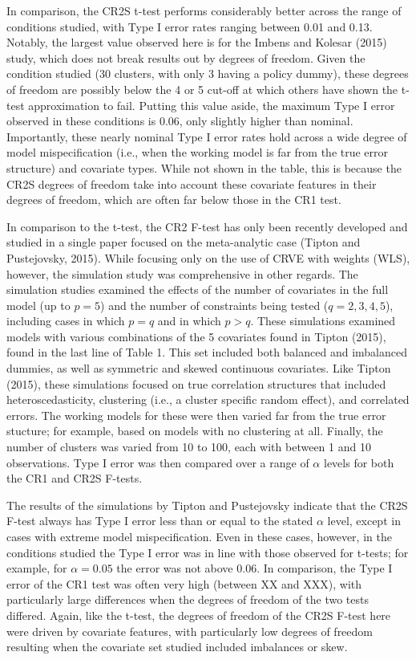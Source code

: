 \documentclass[12pt]{article}\usepackage[]{graphicx}\usepackage[]{color}
\begin{document}
In comparison, the CR2S t-test performs considerably better across the range of conditions studied, with Type I error rates ranging between 0.01 and 0.13.
Notably, the largest value observed here is for the Imbens and Kolesar (2015) study, which does not break results out by degrees of freedom. 
Given the condition studied (30 clusters, with only 3 having a policy dummy), these degrees of freedom are possibly below the 4 or 5 cut-off at which others have shown the t-test approximation to fail. 
Putting this value aside, the maximum Type I error observed in these conditions is 0.06, only slightly higher than nominal.
Importantly, these nearly nominal Type I error rates hold across a wide degree of model mispecification (i.e., when the working model is far from the true error structure) and covariate types.
While not shown in the table, this is because the CR2S degrees of freedom take into account these covariate features in their degrees of freedom, which are often far below those in the CR1 test.


In comparison to the t-test, the CR2 F-test has only been recently developed and studied in a single paper focused on the meta-analytic case (Tipton and Pustejovsky, 2015).
While focusing only on the use of CRVE with weights (WLS), however, the simulation study was comprehensive in other regards.
The simulation studies examined the effects of the number of covariates in the full model (up to $p = 5$) and the number of constraints being tested ($q = 2,3,4,5$), including cases in which $p = q$ and in which $p > q$. 
These simulations examined models with various combinations of the 5 covariates found in Tipton (2015), found in the last line of Table 1. 
This set included both balanced and imbalanced dummies, as well as symmetric and skewed continuous covariates.
Like Tipton (2015), these simulations focused on true correlation structures that included heteroscedasticity, clustering (i.e., a cluster specific random effect), and correlated errors.
The working models for these were then varied far from the true error stucture; for example, based on models with no clustering at all.
Finally, the number of clusters was varied from 10 to 100, each with between 1 and 10 observations. 
Type I error was then compared over a range of $\alpha$ levels for both the CR1 and CR2S F-tests.

The results of the simulations by Tipton and Pustejovsky indicate that the CR2S F-test always has Type I error less than or equal to the stated $\alpha$ level, except in cases with extreme model mispecification. 
Even in these cases, however, in the conditions studied the Type I error was in line with those observed for t-tests; for example, for $\alpha = 0.05$ the error was not above 0.06. 
In comparison, the Type I error of the CR1 test was often very high (between XX and XXX), with particularly large differences when the degrees of freedom of the two tests differed.
Again, like the t-test, the degrees of freedom of the CR2S F-test here were driven by covariate features, with particularly low degrees of freedom resulting when the covariate set studied included imbalances or skew.
\end{document}
